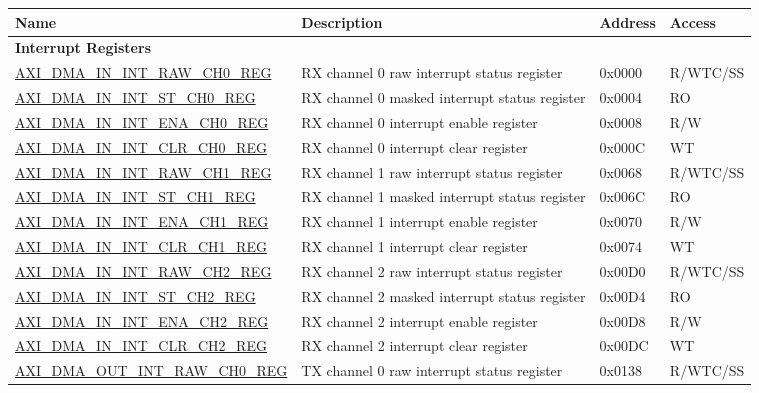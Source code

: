 \begin{longtable}{ | l | p{10cm} | p{1.3cm} | l | }
\hline\rowcolor{lightgray}
\textbf{Name} & \textbf{Description} &  \textbf{Address} & \textbf{Access} \\ \hline
\endhead
\multicolumn{4}{|l|}{\textbf{Interrupt Registers}} \\ \hline
\hyperref[regdesc:AXIDMAININTRAWCHNREG]{AXI\_DMA\_IN\_INT\_RAW\_CH0\_REG} & RX channel 0 raw interrupt status register & 0x0000 & R/WTC/SS \\ \hline
\hyperref[regdesc:AXIDMAININTSTCHNREG]{AXI\_DMA\_IN\_INT\_ST\_CH0\_REG} & RX channel 0 masked interrupt status register & 0x0004 & RO \\ \hline
\hyperref[regdesc:AXIDMAININTENACHNREG]{AXI\_DMA\_IN\_INT\_ENA\_CH0\_REG} & RX channel 0 interrupt enable register & 0x0008 & R/W \\ \hline
\hyperref[regdesc:AXIDMAININTCLRCHNREG]{AXI\_DMA\_IN\_INT\_CLR\_CH0\_REG} & RX channel 0 interrupt clear register & 0x000C & WT \\ \hline
\hyperref[regdesc:AXIDMAININTRAWCHNREG]{AXI\_DMA\_IN\_INT\_RAW\_CH1\_REG} & RX channel 1 raw interrupt status register & 0x0068 & R/WTC/SS \\ \hline
\hyperref[regdesc:AXIDMAININTSTCHNREG]{AXI\_DMA\_IN\_INT\_ST\_CH1\_REG} & RX channel 1 masked interrupt status register & 0x006C & RO \\ \hline
\hyperref[regdesc:AXIDMAININTENACHNREG]{AXI\_DMA\_IN\_INT\_ENA\_CH1\_REG} & RX channel 1 interrupt enable register & 0x0070 & R/W \\ \hline
\hyperref[regdesc:AXIDMAININTCLRCHNREG]{AXI\_DMA\_IN\_INT\_CLR\_CH1\_REG} & RX channel 1 interrupt clear register & 0x0074 & WT \\ \hline
\hyperref[regdesc:AXIDMAININTRAWCHNREG]{AXI\_DMA\_IN\_INT\_RAW\_CH2\_REG} & RX channel 2 raw interrupt status register & 0x00D0 & R/WTC/SS \\ \hline
\hyperref[regdesc:AXIDMAININTSTCHNREG]{AXI\_DMA\_IN\_INT\_ST\_CH2\_REG} & RX channel 2 masked interrupt status register & 0x00D4 & RO \\ \hline
\hyperref[regdesc:AXIDMAININTENACHNREG]{AXI\_DMA\_IN\_INT\_ENA\_CH2\_REG} & RX channel 2 interrupt enable register & 0x00D8 & R/W \\ \hline
\hyperref[regdesc:AXIDMAININTCLRCHNREG]{AXI\_DMA\_IN\_INT\_CLR\_CH2\_REG} & RX channel 2 interrupt clear register & 0x00DC & WT \\ \hline
\hyperref[regdesc:AXIDMAOUTINTRAWCHNREG]{AXI\_DMA\_OUT\_INT\_RAW\_CH0\_REG} & TX channel 0 raw interrupt status register & 0x0138 & R/WTC/SS \\ \hline

\end{longtable}
